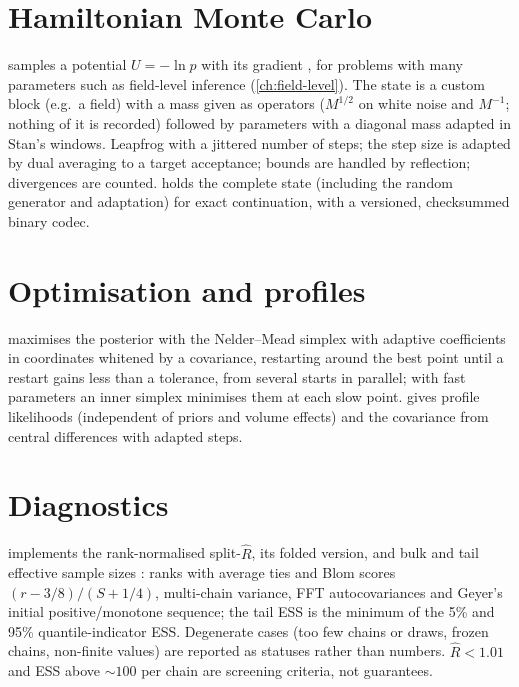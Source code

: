 \section{Hamiltonian Monte Carlo}\label{sec:fit-hmc}

 samples a potential $U=-\ln p$ with its gradient \cite{Duane1987,Neal2011}, for problems with many parameters such as field-level inference
(\cref{ch:field-level}). The state is a custom block (e.g.\ a field) with a mass given as operators ($M^{1/2}$ on white noise and $M^{-1}$; nothing of it is
recorded) followed by parameters with a diagonal mass adapted in Stan's windows. Leapfrog with a jittered number of steps; the step size is adapted by dual
averaging \cite{HoffmanGelman2014} to a target acceptance; bounds are handled by reflection; divergences are counted.  holds the complete state
(including the random generator and adaptation) for exact continuation, with a versioned, checksummed binary codec.

\section{Optimisation and profiles}\label{sec:fit-minimizer}

 maximises the posterior with the Nelder--Mead simplex with adaptive coefficients \cite{GaoHan2012} in coordinates whitened by a covariance,
restarting around the best point until a restart gains less than a tolerance, from several starts in parallel; with fast parameters an inner simplex minimises
them at each slow point.  gives profile likelihoods (independent of priors and volume effects) and  the covariance from central
differences with adapted steps.

\section{Diagnostics}\label{sec:fit-diagnostics}

 implements the rank-normalised split-$\hat R$, its folded version, and bulk and tail effective sample sizes \cite{Vehtari2021}: ranks with
average ties and Blom scores $(r-3/8)/(S+1/4)$, multi-chain variance, FFT autocovariances and Geyer's initial positive/monotone sequence; the tail ESS is the
minimum of the 5\% and 95\% quantile-indicator ESS. Degenerate cases (too few chains or draws, frozen chains, non-finite values) are reported as statuses rather
than numbers. $\hat R<1.01$ and ESS above $\sim100$ per chain are screening criteria, not guarantees.

